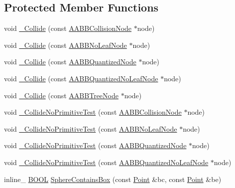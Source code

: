 \subsection*{Protected Member Functions}
\begin{DoxyCompactItemize}
\item 
void \hyperlink{class_sphere_collider_a87e6d2c389bbec6bc24400eb09912232}{\+\_\+\+Collide} (const \hyperlink{class_a_a_b_b_collision_node}{A\+A\+B\+B\+Collision\+Node} $\ast$node)
\item 
void \hyperlink{class_sphere_collider_a0e73ee33d0eaefc60fe8b756cedb7117}{\+\_\+\+Collide} (const \hyperlink{class_a_a_b_b_no_leaf_node}{A\+A\+B\+B\+No\+Leaf\+Node} $\ast$node)
\item 
void \hyperlink{class_sphere_collider_a9e313ae0980c136b19c0bde2724dfde6}{\+\_\+\+Collide} (const \hyperlink{class_a_a_b_b_quantized_node}{A\+A\+B\+B\+Quantized\+Node} $\ast$node)
\item 
void \hyperlink{class_sphere_collider_a3a58245a95a724018734c4039ac76a9e}{\+\_\+\+Collide} (const \hyperlink{class_a_a_b_b_quantized_no_leaf_node}{A\+A\+B\+B\+Quantized\+No\+Leaf\+Node} $\ast$node)
\item 
void \hyperlink{class_sphere_collider_a41d72752c6d07889c74763b86fd9d4f8}{\+\_\+\+Collide} (const \hyperlink{class_a_a_b_b_tree_node}{A\+A\+B\+B\+Tree\+Node} $\ast$node)
\item 
void \hyperlink{class_sphere_collider_a6a83fc6aa69d9b89b979da433aa26acd}{\+\_\+\+Collide\+No\+Primitive\+Test} (const \hyperlink{class_a_a_b_b_collision_node}{A\+A\+B\+B\+Collision\+Node} $\ast$node)
\item 
void \hyperlink{class_sphere_collider_a21c5701914a94187121940781bca8858}{\+\_\+\+Collide\+No\+Primitive\+Test} (const \hyperlink{class_a_a_b_b_no_leaf_node}{A\+A\+B\+B\+No\+Leaf\+Node} $\ast$node)
\item 
void \hyperlink{class_sphere_collider_ae92449297f94e2edd2ac463befbfcdf0}{\+\_\+\+Collide\+No\+Primitive\+Test} (const \hyperlink{class_a_a_b_b_quantized_node}{A\+A\+B\+B\+Quantized\+Node} $\ast$node)
\item 
void \hyperlink{class_sphere_collider_a9a17662f7c12c190bcf996329019e3af}{\+\_\+\+Collide\+No\+Primitive\+Test} (const \hyperlink{class_a_a_b_b_quantized_no_leaf_node}{A\+A\+B\+B\+Quantized\+No\+Leaf\+Node} $\ast$node)
\item 
inline\+\_\+ \hyperlink{_ice_types_8h_a050c65e107f0c828f856a231f4b4e788}{B\+O\+O\+L} \hyperlink{class_sphere_collider_ad08e90e847c406df4dde2966305f4a40}{Sphere\+Contains\+Box} (const \hyperlink{class_point}{Point} \&bc, const \hyperlink{class_point}{Point} \&be)

\end{DoxyCompactItemize}
